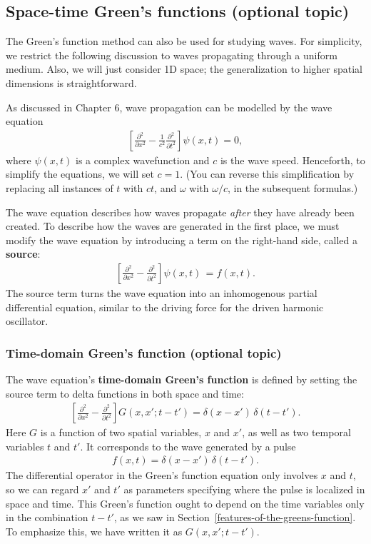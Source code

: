 \documentclass[10pt,a4paper]{article}
\begin{document}
\subsection{Space-time Green's functions (optional topic)}
\label{space-time-greens-functions}

The Green's function method can also be used for studying waves. For
simplicity, we restrict the following discussion to waves propagating
through a uniform medium. Also, we will just consider 1D space; the
generalization to higher spatial dimensions is straightforward.

As discussed in Chapter 6, wave propagation can be modelled by the
wave equation
\begin{align}
  \left[\frac{\partial^2}{\partial x^2} - \frac{1}{c^2} \frac{\partial^2}{\partial t^2} \right] \psi(x,t) = 0,
\end{align}
where $\psi(x,t)$ is a complex wavefunction and $c$ is the wave
speed. Henceforth, to simplify the equations, we will set $c = 1$.
(You can reverse this simplification by replacing all instances of $t$
with $c t$, and $\omega$ with $\omega/c$, in the subsequent formulas.)

The wave equation describes how waves propagate \textit{after} they
have already been created. To describe how the waves are generated in
the first place, we must modify the wave equation by introducing a
term on the right-hand side, called a \textbf{source}:
\begin{align}
  \left[\frac{\partial^2}{\partial x^2} - \frac{\partial^2}{\partial t^2} \right] \psi(x,t)\, = f(x,t).
\end{align}
The source term turns the wave equation into an inhomogenous partial
differential equation, similar to the driving force for the driven
harmonic oscillator.

\subsubsection{Time-domain Green's function (optional topic)}
\label{time-domain-greens-function}

The wave equation's \textbf{time-domain Green's function} is defined
by setting the source term to delta functions in both space and time:
\begin{align}
  \left[\frac{\partial^2}{\partial x^2} - \frac{\partial^2}{\partial t^2} \right] G(x,x';t-t') = \delta(x-x')\, \delta(t-t').
\end{align}
Here $G$ is a function of two spatial variables, $x$ and $x'$, as well
as two temporal variables $t$ and $t'$.  It corresponds to the wave
generated by a pulse
\begin{align}
  f(x,t) = \delta(x-x')\,\delta(t-t').
\end{align}
The differential operator in the Green's function equation only
involves $x$ and $t$, so we can regard $x'$ and $t'$ as parameters
specifying where the pulse is localized in space and time.  This
Green's function ought to depend on the time variables only in the
combination $t-t'$, as we saw in
Section~\ref{features-of-the-greens-function}. To emphasize this, we
have written it as $G(x,x';t-t')$.
\end{document}
